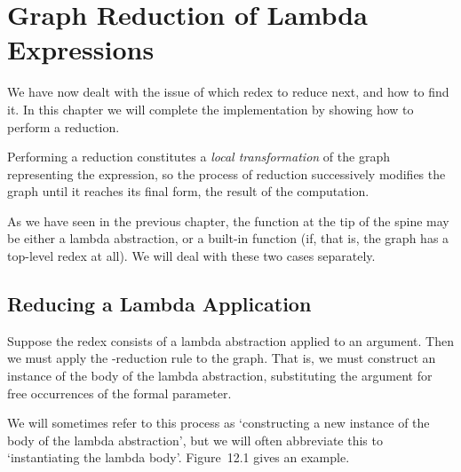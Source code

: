 \chapter{Graph Reduction of Lambda\\Expressions}
\vspace{1cm}

\noindent
We have now dealt with the issue of which redex to reduce next, and how to
find it. In this chapter we will complete the implementation by showing how to
perform a reduction.

Performing a reduction constitutes a \textit{local transformation} of the graph
representing the expression, so the process of reduction successively modifies
the graph until it reaches its final form, the result of the computation.

As we have seen in the previous chapter, the function at the tip of the spine
may be either a lambda abstraction, or a built-in function (if, that is, the graph
has a top-level redex at all). We will deal with these two cases separately.

\section{Reducing a Lambda Application}

Suppose the redex consists of a lambda abstraction applied to an argument.
Then we must apply the \tb-reduction rule to the graph. That is, we must
construct an instance of the body of the lambda abstraction, substituting the
argument for free occurrences of the formal parameter.

We will sometimes refer to this process as `constructing a new instance of
the body of the lambda abstraction’, but we will often abbreviate this to
`instantiating the lambda body’. Figure~12.1 gives an example.


